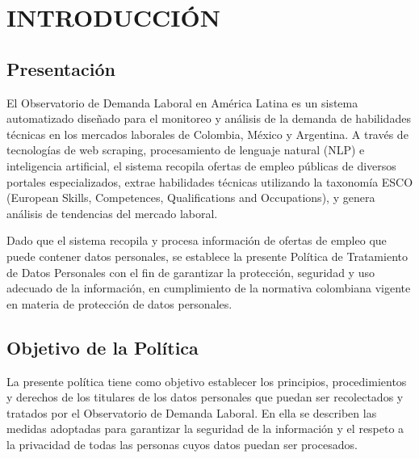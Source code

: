 \documentclass[11pt,oneside,letterpaper]{article}
\begin{document}
\tableofcontents
\newpage


\section{INTRODUCCIÓN}

\subsection{Presentación}

El Observatorio de Demanda Laboral en América Latina es un sistema automatizado diseñado para el monitoreo y análisis de la demanda de habilidades técnicas en los mercados laborales de Colombia, México y Argentina. A través de tecnologías de web scraping, procesamiento de lenguaje natural (NLP) e inteligencia artificial, el sistema recopila ofertas de empleo públicas de diversos portales especializados, extrae habilidades técnicas utilizando la taxonomía ESCO (European Skills, Competences, Qualifications and Occupations), y genera análisis de tendencias del mercado laboral.

Dado que el sistema recopila y procesa información de ofertas de empleo que puede contener datos personales, se establece la presente Política de Tratamiento de Datos Personales con el fin de garantizar la protección, seguridad y uso adecuado de la información, en cumplimiento de la normativa colombiana vigente en materia de protección de datos personales.

\subsection{Objetivo de la Política}

La presente política tiene como objetivo establecer los principios, procedimientos y derechos de los titulares de los datos personales que puedan ser recolectados y tratados por el Observatorio de Demanda Laboral. En ella se describen las medidas adoptadas para garantizar la seguridad de la información y el respeto a la privacidad de todas las personas cuyos datos puedan ser procesados.
\end{document}
